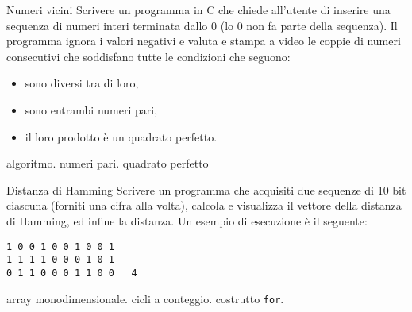 \begin{exrev}{Numeri vicini}
Scrivere un programma in C che chiede all'utente di inserire una sequenza di numeri interi terminata dallo 0 (lo 0 non fa parte della sequenza). Il programma ignora i valori negativi e valuta e stampa a video le coppie di numeri consecutivi che soddisfano tutte le condizioni che seguono:\begin{itemize}
\item sono diversi tra di loro,
\item sono entrambi numeri pari,
\item il loro prodotto \`e un quadrato perfetto.
\end{itemize}


\begin{tags}
algoritmo. numeri pari. quadrato perfetto
\end{tags}


\end{exrev}

\begin{exrev}{Distanza di Hamming}
Scrivere un programma che acquisiti due sequenze di 10 bit ciascuna (forniti una cifra alla volta), calcola e visualizza il vettore della distanza di Hamming, ed infine la distanza. Un esempio di esecuzione \`e il seguente:
\begin{verbatim}
1 0 0 1 0 0 1 0 0 1
1 1 1 1 0 0 0 1 0 1
0 1 1 0 0 0 1 1 0 0   4
\end{verbatim}

\begin{tags}
array monodimensionale. cicli a conteggio. costrutto \texttt{for}.
\end{tags}

\end{exrev}

